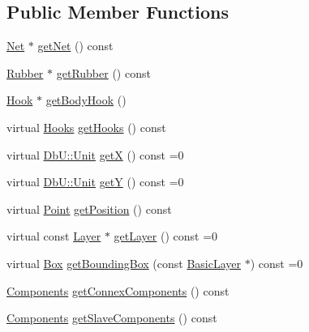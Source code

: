\subsection*{Public Member Functions}
\begin{DoxyCompactItemize}
\item 
\mbox{\hyperlink{classHurricane_1_1Net}{Net}} $\ast$ \mbox{\hyperlink{classHurricane_1_1Component_a1556ef77d6b89bfc17698d52ebde9791}{get\+Net}} () const
\item 
\mbox{\hyperlink{classHurricane_1_1Rubber}{Rubber}} $\ast$ \mbox{\hyperlink{classHurricane_1_1Component_ab701515debfdf1bf4142d4d917aaab1d}{get\+Rubber}} () const
\item 
\mbox{\hyperlink{classHurricane_1_1Hook}{Hook}} $\ast$ \mbox{\hyperlink{classHurricane_1_1Component_a19f06d7cad163bab3b97a13f4736c9d1}{get\+Body\+Hook}} ()
\item 
virtual \mbox{\hyperlink{namespaceHurricane_a9dcd9b74dc5e2b51bec7a13c25807e02}{Hooks}} \mbox{\hyperlink{classHurricane_1_1Component_a1fc513b9465b2b8c22f41d56bf775594}{get\+Hooks}} () const
\item 
virtual \mbox{\hyperlink{group__DbUGroup_ga4fbfa3e8c89347af76c9628ea06c4146}{Db\+U\+::\+Unit}} \mbox{\hyperlink{classHurricane_1_1Component_a0f8299ed73705fd4fbf56589dcc7e074}{getX}} () const =0
\item 
virtual \mbox{\hyperlink{group__DbUGroup_ga4fbfa3e8c89347af76c9628ea06c4146}{Db\+U\+::\+Unit}} \mbox{\hyperlink{classHurricane_1_1Component_a727da3f127c3a7a0a09468219f98c3e6}{getY}} () const =0
\item 
virtual \mbox{\hyperlink{classHurricane_1_1Point}{Point}} \mbox{\hyperlink{classHurricane_1_1Component_aa4e9a47c89fe701670ca34355195d519}{get\+Position}} () const
\item 
virtual const \mbox{\hyperlink{classHurricane_1_1Layer}{Layer}} $\ast$ \mbox{\hyperlink{classHurricane_1_1Component_ab451ef19059e6e5bbb77ae391d02a039}{get\+Layer}} () const =0
\item 
virtual \mbox{\hyperlink{classHurricane_1_1Box}{Box}} \mbox{\hyperlink{classHurricane_1_1Component_aabb87b9ef71f71cea681a03a6213f616}{get\+Bounding\+Box}} (const \mbox{\hyperlink{classHurricane_1_1BasicLayer}{Basic\+Layer}} $\ast$) const =0
\item 
\mbox{\hyperlink{namespaceHurricane_a7d26d99aeb5dd6d70d51bd35d2473e72}{Components}} \mbox{\hyperlink{classHurricane_1_1Component_a4acf996c03b0b94a186fad653ba578a6}{get\+Connex\+Components}} () const
\item 
\mbox{\hyperlink{namespaceHurricane_a7d26d99aeb5dd6d70d51bd35d2473e72}{Components}} \mbox{\hyperlink{classHurricane_1_1Component_af6d6b7c6b3cb18754cfa02bc5fb1e754}{get\+Slave\+Components}} () const
\end{DoxyCompactItemize}

